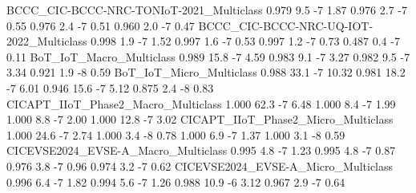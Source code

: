 BCCC_CIC-BCCC-NRC-TONIoT-2021_Multiclass                              0.979                9.5           -7            1.87      0.976                   2.7              -7               0.55      0.976                   2.4              -7               0.51       0.960                    2.0               -7                0.47
BCCC_CIC-BCCC-NRC-UQ-IOT-2022_Multiclass                              0.998                1.9           -7            1.52      0.997                   1.6              -7               0.53      0.997                   1.2              -7               0.73       0.487                    0.4               -7                0.11
BoT_IoT_Macro_Multiclass                                              0.989               15.8           -7            4.59      0.983                   9.1              -7               3.27      0.982                   9.5              -7               3.34       0.921                    1.9               -8                0.59
BoT_IoT_Micro_Multiclass                                              0.988               33.1           -7           10.32      0.981                  18.2              -7               6.01      0.946                  15.6              -7               5.12       0.875                    2.4               -8                0.83
CICAPT_IIoT_Phase2_Macro_Multiclass                                   1.000               62.3           -7            6.48      1.000                   8.4              -7               1.99      1.000                   8.8              -7               2.00       1.000                   12.8               -7                3.02
CICAPT_IIoT_Phase2_Micro_Multiclass                                   1.000               24.6           -7            2.74      1.000                   3.4              -8               0.78      1.000                   6.9              -7               1.37       1.000                    3.1               -8                0.59
CICEVSE2024_EVSE-A_Macro_Multiclass                                   0.995                4.8           -7            1.23      0.995                   4.8              -7               0.87      0.976                   3.8              -7               0.96       0.974                    3.2               -7                0.62
CICEVSE2024_EVSE-A_Micro_Multiclass                                   0.996                6.4           -7            1.82      0.994                   5.6              -7               1.26      0.988                  10.9              -6               3.12       0.967                    2.9               -7                0.64
